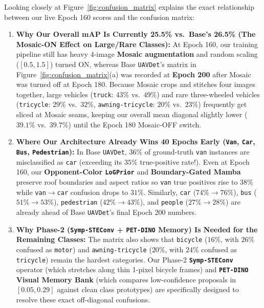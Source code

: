 \documentclass[11pt,a4paper]{article}
\begin{document}
Looking closely at Figure~\ref{fig:confusion_matrix} explains the exact relationship between our live Epoch 160 scores and the confusion matrix:
\begin{enumerate}[leftmargin=1.6em]
    \item \textbf{Why Our Overall mAP Is Currently 25.5\% vs.\ Base's 26.5\% (The Mosaic-ON Effect on Large/Rare Classes):} At Epoch 160, our training pipeline still has heavy 4-image \textbf{Mosaic augmentation} and random scaling ($[0.5, 1.5]$) turned ON, whereas Base \texttt{UAVDet}'s matrix in Figure~\ref{fig:confusion_matrix}(a) was recorded at \textbf{Epoch 200} after Mosaic was turned off at Epoch 180. Because Mosaic crops and stitches four images together, large vehicles (\texttt{truck}: $43\%$ vs.\ $49\%$) and rare three-wheeled vehicles (\texttt{tricycle}: $29\%$ vs.\ $32\%$, \texttt{awning-tricycle}: $20\%$ vs.\ $23\%$) frequently get sliced at Mosaic seams, keeping our overall mean diagonal slightly lower ($39.1\%$ vs.\ $39.7\%$) until the Epoch 180 Mosaic-OFF switch.
    \item \textbf{Where Our Architecture Already Wins 40 Epochs Early (\texttt{Van}, \texttt{Car}, \texttt{Bus}, \texttt{Pedestrian}):} In Base \texttt{UAVDet}, $36\%$ of ground-truth \texttt{van} instances are misclassified as \texttt{car} (exceeding its $35\%$ true-positive rate!). Even at Epoch 160, our \textbf{Opponent-Color \texttt{LoGPrior}} and \textbf{Boundary-Gated Mamba} preserve roof boundaries and aspect ratios so \texttt{van} true positives rise to \textbf{$38\%$} while \texttt{van}$\rightarrow$\texttt{car} confusion drops to $31\%$. Similarly, \texttt{car} ($74\% \rightarrow 76\%$), \texttt{bus} ($51\% \rightarrow 53\%$), \texttt{pedestrian} ($42\% \rightarrow 43\%$), and \texttt{people} ($27\% \rightarrow 28\%$) are already ahead of Base \texttt{UAVDet}'s final Epoch 200 numbers.
    \item \textbf{Why Phase-2 (\texttt{Symp-STEConv} + \texttt{PET-DINO} Memory) Is Needed for the Remaining Classes:} The matrix also shows that \texttt{bicycle} ($16\%$, with $26\%$ confused as \texttt{motor}) and \texttt{awning-tricycle} ($20\%$, with $24\%$ confused as \texttt{tricycle}) remain the hardest categories. Our Phase-2 \textbf{\texttt{Symp-STEConv}} operator (which stretches along thin 1-pixel bicycle frames) and \textbf{\texttt{PET-DINO} Visual Memory Bank} (which compares low-confidence proposals in $[0.05, 0.29]$ against clean class prototypes) are specifically designed to resolve these exact off-diagonal confusions.
\end{enumerate}
\end{document}
